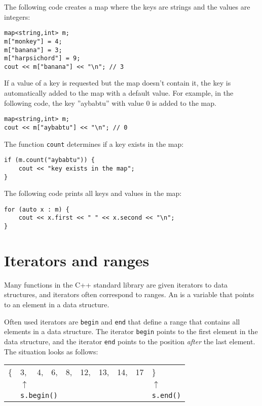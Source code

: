 The following code creates a map
where the keys are strings and the values are integers:

\begin{lstlisting}
map<string,int> m;
m["monkey"] = 4;
m["banana"] = 3;
m["harpsichord"] = 9;
cout << m["banana"] << "\n"; // 3
\end{lstlisting}

If a value of a key is requested
but the map doesn't contain it,
the key is automatically added to the map with
a default value.
For example, in the following code,
the key ''aybabtu'' with value 0
is added to the map.

\begin{lstlisting}
map<string,int> m;
cout << m["aybabtu"] << "\n"; // 0
\end{lstlisting}
The function \texttt{count} determines
if a key exists in the map:
\begin{lstlisting}
if (m.count("aybabtu")) {
    cout << "key exists in the map";
}
\end{lstlisting}
The following code prints all keys and values
in the map:
\begin{lstlisting}
for (auto x : m) {
    cout << x.first << " " << x.second << "\n";
}
\end{lstlisting}

\section{Iterators and ranges}


Many functions in the C++ standard library
are given iterators to data structures,
and iterators often correspond to ranges.
An  is a variable that points
to an element in a data structure.

Often used iterators are \texttt{begin}
and \texttt{end} that define a range that contains
all elements in a data structure.
The iterator \texttt{begin} points to
the first element in the data structure,
and the iterator \texttt{end} points to
the position \emph{after} the last element.
The situation looks as follows:

\begin{center}
\begin{tabular}{llllllllll}
\{ & 3, & 4, & 6, & 8, & 12, & 13, & 14, & 17 & \} \\
& $\uparrow$ & & & & & & & & $\uparrow$ \\
& \multicolumn{3}{l}{\texttt{s.begin()}} & & & & & & \texttt{s.end()} \\
\end{tabular}
\end{center}

